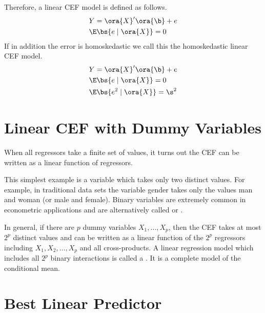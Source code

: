 Therefore, a linear CEF model is defined as follows.
\begin{equation}
    \notag
    \begin{aligned}
        & Y = \ora{X}^\prime \ora{\b} + e \\
        & \E\bs{e \mid \ora{X}} = 0
    \end{aligned}
\end{equation}
If in addition the error is homoskedastic we call this the homoskedastic linear CEF model.
\begin{equation}
    \notag
    \begin{aligned}
        & Y = \ora{X}^\prime \ora{\b} + e \\
        & \E\bs{e \mid \ora{X}} = 0 \\
        & \E\bs{e^2 \mid \ora{X}} = \s^2
    \end{aligned}
\end{equation}


\setcounter{section}{16}
\section{Linear CEF with Dummy Variables}

When all regressors take a finite set of values, it turns out the CEF can be written as a linear function of regressors. 

This simplest example is a  variable which takes only two distinct values. For example, in traditional data sets the variable gender takes only the values man and woman (or male and female). Binary variables are extremely common in econometric applications and are alternatively called  or .

In general, if there are $p$ dummy variables $X_1, \ldots, X_p$, then the CEF takes at most $2^p$ distinct values and can be written as a linear function of the $2^p$ regressors including $X_1, X_2, \ldots, X_p$ and all cross-products. A linear regression model which includes all $2^p$ binary interactions is called a . It is a complete model of the conditional mean. 

\section{Best Linear Predictor} \label{hansen_sec_2_18}
\setcounter{equation}{16}

